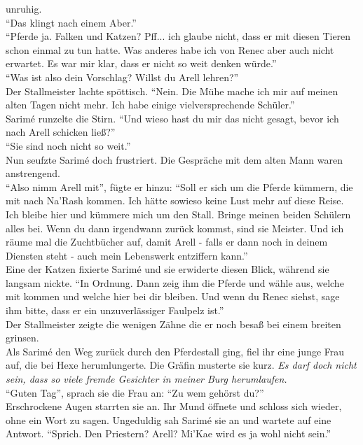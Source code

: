 unruhig.\\
``Das klingt nach einem Aber.''\\
``Pferde ja. Falken und Katzen? Pff... ich glaube nicht, dass er mit diesen Tieren schon einmal zu 
tun hatte. Was anderes habe ich von Renec aber auch nicht erwartet. Es war mir klar, dass er nicht 
so weit denken würde.''\\
``Was ist also dein Vorschlag? Willst du Arell lehren?''\\
Der Stallmeister lachte spöttisch. ``Nein. Die Mühe mache ich mir auf meinen alten Tagen nicht 
mehr. Ich habe einige vielversprechende Schüler.''\\
Sarimé runzelte die Stirn. ``Und wieso hast du mir das nicht gesagt, bevor ich nach Arell schicken 
ließ?''\\
``Sie sind noch nicht so weit.''\\
Nun seufzte Sarimé doch frustriert. Die Gespräche mit dem alten Mann waren anstrengend.\\
``Also nimm Arell mit'', fügte er hinzu: ``Soll er sich um die Pferde kümmern, die mit nach Na'Rash 
kommen. Ich hätte sowieso keine Lust mehr auf diese Reise. Ich bleibe hier und kümmere mich um den 
Stall. Bringe meinen beiden Schülern alles bei. Wenn du dann irgendwann zurück kommst, sind sie 
Meister. Und ich räume mal die Zuchtbücher auf, damit Arell - falls er dann noch in deinem Diensten 
steht - auch mein Lebenswerk entziffern kann.''\\
Eine der Katzen fixierte Sarimé und sie erwiderte diesen Blick, während sie langsam nickte. ``In 
Ordnung. Dann zeig ihm die Pferde und wähle aus, welche mit kommen und welche hier bei dir bleiben. 
Und wenn du Renec siehst, sage ihm bitte, dass er ein unzuverlässiger Faulpelz ist.''\\
Der Stallmeister zeigte die wenigen Zähne die er noch besaß bei einem breiten grinsen.\\
Als Sarimé den Weg zurück durch den Pferdestall ging, fiel ihr eine junge Frau auf, die bei Hexe 
herumlungerte. Die Gräfin musterte sie kurz. \textit{Es darf doch nicht sein, dass so viele fremde 
Gesichter in meiner Burg herumlaufen.}\\
``Guten Tag'', sprach sie die Frau an: ``Zu wem gehörst du?''\\
Erschrockene Augen starrten sie an. Ihr Mund öffnete und schloss sich wieder, ohne ein Wort zu 
sagen. Ungeduldig sah Sarimé sie an und wartete auf eine Antwort. ``Sprich. Den Priestern? Arell? 
Mi'Kae wird es ja wohl nicht sein.''\\
